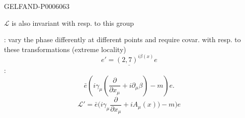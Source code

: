 \begin{GelfandAdjacentEvidence}{GELFAND-P000606}{3}


\(\mathcal L\) is also invariant with resp. to this group\qquad {}

: vary the phase differently at different points and require covar. with resp. to these transformations (extreme locality)
\[
\underline{e'=(2{,}7)^{i\beta(x)}e}
\]
:
\[
\bar e\left(i\gamma_\mu\left(\frac{\partial}{\partial x_\mu}+i\partial_\mu\beta\right)-m\right)e.
\]
\[
\mathcal L'=\bar e\biggl(i\gamma_\mu\frac{\partial}{\partial x_\mu}
+iA_\mu(x)\biggr)-m\biggr)e
\]
\end{GelfandAdjacentEvidence}




